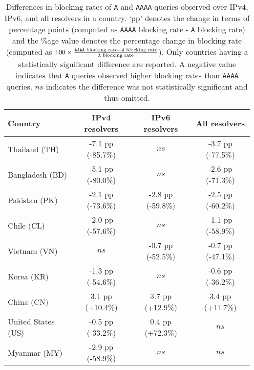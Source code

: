 \begin{table}[t]
  \centering
  \small
  \scalebox{\tabularscale} {
  \begin{tabular}{lccc}%
    \toprule
    {\bf Country}&{\bf IPv4 resolvers}&{\bf IPv6 resolvers} & {\bf All resolvers}
    \\ \midrule
    Thailand (TH)      & -7.1 pp (-85.7\%) & $ns$               & -3.7 pp (-77.5\%) \\
    Bangladesh (BD)    & -5.1 pp (-80.0\%) & $ns$               & -2.6 pp (-71.3\%) \\
    Pakistan (PK)      & -2.1 pp (-73.6\%) & -2.8 pp (-59.8\%)  & -2.5 pp (-60.2\%) \\
    Chile (CL)         & -2.0 pp (-57.6\%) & $ns$               & -1.1 pp (-58.9\%) \\
    Vietnam (VN)       & $ns$              & -0.7 pp (-52.5\%)  & -0.7 pp (-47.1\%) \\
    Korea (KR)         & -1.3 pp (-54.6\%) & $ns$               & -0.6 pp (-36.2\%) \\
    China (CN)         &  3.1 pp (+10.4\%) &  3.7 pp (+12.9\%)  &  3.4 pp (+11.7\%) \\
    \midrule
    United States (US) & -0.5 pp (-33.2\%) &  0.4 pp (+72.3\%)  &  $ns$  \\
    Myanmar (MY)       & -2.9 pp (-58.9\%) & $ns$    &  $ns$  \\
    \bottomrule
  \end{tabular}
  }
  \caption{Differences in blocking rates of {\tt A} and {\tt AAAA} queries
  observed over IPv4, IPv6, and all resolvers in a country. `pp' denotes the
  change in terms of percentage points (computed as {\tt AAAA} blocking rate
  - {\tt A} blocking rate) and the \%age value denotes the percentage change in
  blocking rate (computed as
  $
  100\times\frac{\text{{\tt AAAA} blocking rate} - \text{{\tt A} blocking rate}}
  {\text{{\tt A} blocking rate}}
  $). 
  Only countries having
  a statistically significant difference are reported. A negative value
  indicates that {\tt A} queries observed higher blocking rates than {\tt AAAA}
  queries. $ns$ indicates the difference was not statistically significant and
  thus omitted.}
  \label{tab:resources:countries}
\end{table}

